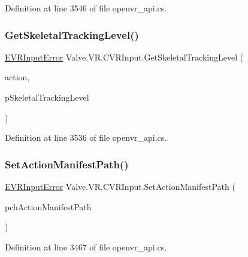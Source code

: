 Definition at line 3546 of file openvr\+\_\+api.\+cs.

\mbox{\label{class_valve_1_1_v_r_1_1_c_v_r_input_a068d729d5cc82bed9bfec96d925911c3}} 
\subsubsection{\texorpdfstring{GetSkeletalTrackingLevel()}{GetSkeletalTrackingLevel()}}
{\footnotesize\ttfamily \mbox{\hyperlink{namespace_valve_1_1_v_r_a592d7f4189b8346d6c96dbdbaa35bc1b}{E\+V\+R\+Input\+Error}} Valve.\+V\+R.\+C\+V\+R\+Input.\+Get\+Skeletal\+Tracking\+Level (\begin{DoxyParamCaption}\item[{ulong}]{action,  }\item[{ref \mbox{\hyperlink{namespace_valve_1_1_v_r_a6f46bd50fb65255d6537ab32a6bddc30}{E\+V\+R\+Skeletal\+Tracking\+Level}}}]{p\+Skeletal\+Tracking\+Level }\end{DoxyParamCaption})}



Definition at line 3536 of file openvr\+\_\+api.\+cs.

\mbox{\label{class_valve_1_1_v_r_1_1_c_v_r_input_a8d87a662f5616e4861e844b1edbc415d}} 
\subsubsection{\texorpdfstring{SetActionManifestPath()}{SetActionManifestPath()}}
{\footnotesize\ttfamily \mbox{\hyperlink{namespace_valve_1_1_v_r_a592d7f4189b8346d6c96dbdbaa35bc1b}{E\+V\+R\+Input\+Error}} Valve.\+V\+R.\+C\+V\+R\+Input.\+Set\+Action\+Manifest\+Path (\begin{DoxyParamCaption}\item[{string}]{pch\+Action\+Manifest\+Path }\end{DoxyParamCaption})}



Definition at line 3467 of file openvr\+\_\+api.\+cs.

